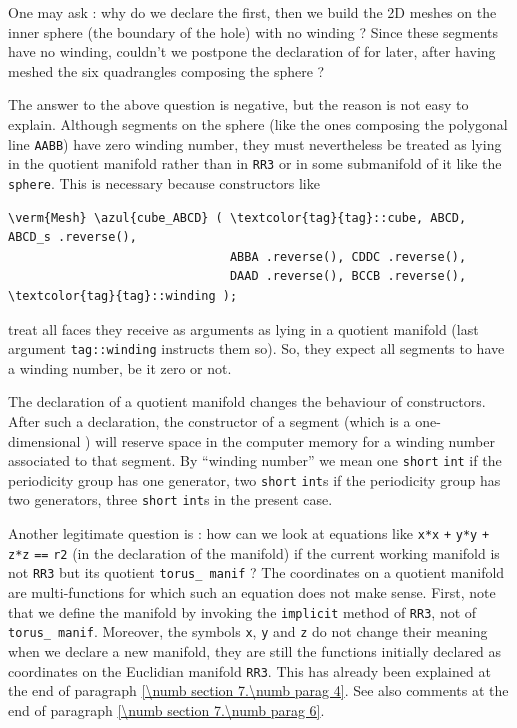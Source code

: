 One may ask : why do we declare the {\small\tt{}} {\small\tt{}} first,
then we build the 2D meshes on the inner sphere (the boundary of the hole) with no winding ?
Since these segments have no winding, couldn't we postpone the declaration of
{\small\tt{}} for later, after having meshed the six quadrangles composing the sphere ?

The answer to the above question is negative, but the reason is not easy to explain.
Although segments on the sphere (like the ones composing the polygonal line {\small\tt AABB})
have zero winding number, they must nevertheless be treated as lying in the quotient manifold
rather than in {\small\tt RR3} or in some submanifold of it like the {\small\tt sphere}.
This is necessary because {\small\tt{}} constructors like

\begin{Verbatim}[commandchars=\\\{\},formatcom=\small\tt,
   baselinestretch=0.94,framesep=2mm                      ]
   \verm{Mesh} \azul{cube_ABCD} ( \textcolor{tag}{tag}::cube, ABCD, ABCD_s .reverse(),
                               ABBA .reverse(), CDDC .reverse(),
                               DAAD .reverse(), BCCB .reverse(), \textcolor{tag}{tag}::winding );
\end{Verbatim}

\noindent treat all faces they receive as arguments as lying in a quotient manifold
(last argument {\small\tt\textcolor{tag}{tag}::winding} instructs them so).
So, they expect all segments to have a winding number, be it zero or not.

The declaration of a quotient manifold changes the behaviour of {\small\tt{}} constructors.
After such a declaration, the constructor of a segment (which is a one-dimensional
{\small\tt{}}) will reserve space in the computer memory for a winding number
associated to that segment.
By ``winding number'' we mean one {\small\tt short} {\small\tt int} if the periodicity group
has one generator, two {\small\tt short} {\small\tt int}s if the periodicity group has two
generators, three {\small\tt short} {\small\tt int}s in the present case.

Another legitimate question is : how can we look at equations like {\small\tt x*x} {\small\tt +}
{\small\tt y*y} {\small\tt +} {\small\tt z*z} {\small\tt ==} {\small\tt r2}
(in the declaration of the {\small\tt{}} manifold) if the current working manifold
is not {\small\tt RR3} but its quotient {\small\tt torus\_\,manif} ?
The coordinates on a quotient manifold are multi-functions for which such an equation
does not make sense.
First, note that we define the {\small\tt{}} manifold by invoking the
{\small\tt implicit} method of {\small\tt RR3}, not of {\small\tt torus\_\,manif}.
Moreover, the symbols {\small\tt x}, {\small\tt y} and {\small\tt z} do not change their meaning
when we declare a new manifold, they are still the functions initially declared as coordinates
on the Euclidian manifold {\small\tt RR3}.
This has already been explained at the end of paragraph \ref{\numb section 7.\numb parag 4}.
See also comments at the end of paragraph \ref{\numb section 7.\numb parag 6}.

